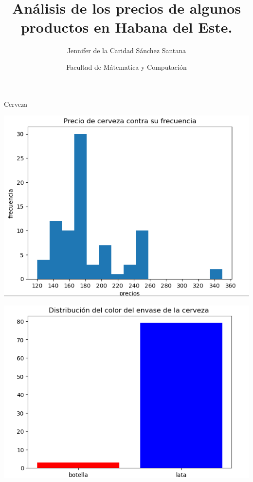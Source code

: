 \documentclass{beamer}
\title{Análisis de los precios de algunos productos en Habana del Este.}
\date{Facultad de Mátematica y Computación}
\author{Jennifer de la Caridad Sánchez Santana}
\begin{document}
\begin{frame}
\titlepage
\end{frame}

\begin{frame}{Cerveza}
    
    \includegraphics[scale=0.5]{precio cerveza.png}
    \end{frame}

\begin{frame}
    \includegraphics[scale=0.5]{envase cerveza.png}
    \end{frame}
\end{document}
